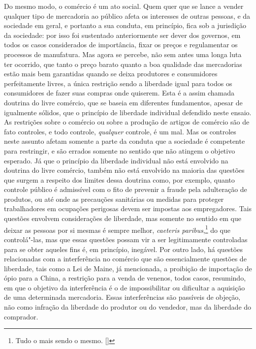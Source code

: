Do mesmo modo, o comércio é um ato social. Quem quer que se lance a
vender qualquer tipo de mercadoria ao público afeta os
interesses de outras pessoas, e da sociedade em geral, e portanto a sua
conduta, em princípio, fica sob a jurisdição da sociedade: por isso foi
sustentado anteriormente ser dever dos governos, em todos os casos
considerados de importância, fixar os preços e regulamentar os
processos de manufatura. Mas agora se percebe, não sem antes uma longa
luta ter ocorrido, que tanto o preço barato quanto a boa qualidade das
mercadorias estão mais bem garantidas quando se deixa produtores e
consumidores perfeitamente livres, a única restrição sendo a liberdade
igual para todos os consumidores de fazer suas compras onde quiserem.
Esta é a assim chamada doutrina do livre comércio, que se baseia em
diferentes fundamentos, apesar de igualmente sólidos, que o princípio
de liberdade individual defendido neste ensaio. As restrições sobre o
comércio ou sobre a produção de artigos de comércio são de fato
controles, e todo controle, \textit{qualquer} controle, é um mal. Mas os controles
neste assunto afetam somente a parte da conduta que a sociedade é
competente para restringir, e são errados somente no sentido que não
atingem o objetivo esperado. Já que o princípio da liberdade individual
não está envolvido na doutrina do livre comércio, também não está
envolvido na maioria das questões que surgem a respeito dos limites
dessa doutrina como, por exemplo, quanto controle público é admissível
com o fito de prevenir a fraude pela adulteração de produtos, ou até
onde as precauções sanitárias ou medidas para proteger trabalhadores
em ocupações perigosas devem ser impostas aos empregadores. Tais
questões envolvem considerações de liberdade, mas somente no sentido
em que deixar as pessoas por si mesmas é sempre melhor, \textit{caeteris
paribus},\footnote{ Tudo o mais sendo o mesmo. []} 
do que controlá"-las, mas que essas questões possam vir a ser
legitimamente controladas para se obter aqueles fins é, em princípio,
inegável. Por outro lado, há questões relacionadas com a
interferência no comércio que são essencialmente questões de liberdade,
tais como a Lei de Maine, já mencionada, a proibição de importação de
ópio para a China, a restrição para a venda de venenos, todos casos,
resumindo, em que o objetivo da interferência é o de impossibilitar ou
dificultar a aquisição de uma determinada mercadoria. Essas
interferências são passíveis de objeção, não como infração da liberdade
do produtor ou do vendedor, mas da liberdade do comprador. 

